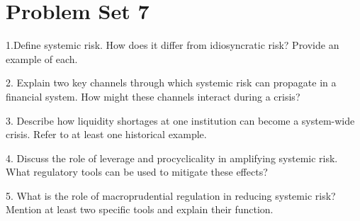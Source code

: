 \section{Problem Set 7}


1.Define systemic risk. How does it differ from idiosyncratic risk? Provide an example of each.

2. Explain two key channels through which systemic risk can propagate in a financial system. How might these channels interact during a crisis?

3. Describe how liquidity shortages at one institution can become a system-wide crisis. Refer to at least one historical example.

4. Discuss the role of leverage and procyclicality in amplifying systemic risk. What regulatory tools can be used to mitigate these effects?

5. What is the role of macroprudential regulation in reducing systemic risk? Mention at least two specific tools and explain their function.
